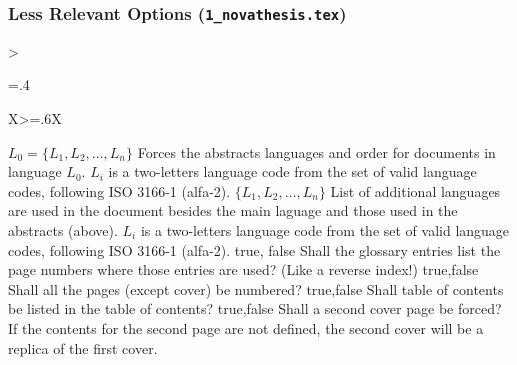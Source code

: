 \subsubsection{Less Relevant Options (\texttt{1\_novathesis.tex})} %
\label{ssub:less_relevant_options_1}


\bgroup
\begin{xltabular}{\linewidth}{>{\hsize=.4\hsize\raggedright\arraybackslash}X>{\hsize=.6\hsize}X}
  \toprule
	    {$L_0 = \{L_1, L_2, \ldots, L_n\}$}%
	    {Forces the abstracts languages and order for documents in language $L_0$.}%
		{%
		$L_i$ is a two-letters language code from the set of valid language codes, following ISO 3166-1 (alfa-2).
	    }
	    \midrule
	    {$\{L_1, L_2, \ldots, L_n\}$}%
	    {List of additional languages are used in the document besides the main laguage and those used in the abstracts (above).}%
		{%
		$L_i$ is a two-letters language code from the set of valid language codes, following ISO 3166-1 (alfa-2).
	    }
	    \midrule
  	  	{true, \newline false}%
	    {Shall the glossary entries list the page numbers where those entries are used?  (Like a reverse index!)}%
		{}
	    \midrule
  	  	{true,\newline false }%
	    {Shall all the pages (except cover) be numbered?}%
		{}
	    \midrule
  	  	{true,\newline false }%
	    {Shall table of contents be listed in the table of contents?}%
		{}
	    \midrule
  	  	{true,\newline false }%
	    {Shall a second cover page be forced?}%
		{If the contents for the second page are not defined, the second cover will be a replica of the first cover.}

\end{xltabular}
